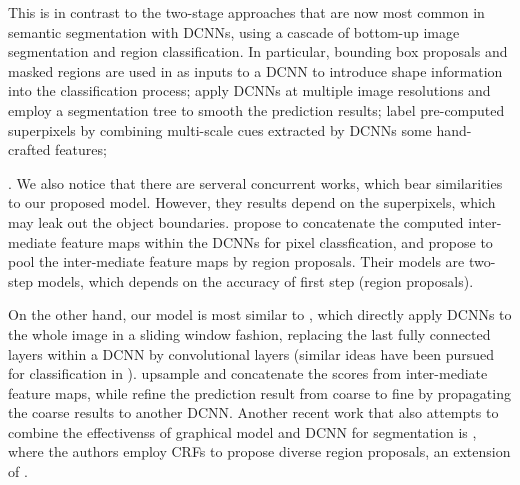 
This is in contrast to the two-stage approaches that are now most common in semantic segmentation with DCNNs, using a cascade of bottom-up image segmentation and region classification. In particular, bounding box proposals and masked regions are used in 
\citet{girshick2014rcnn, hariharan2014simultaneous}  as inputs to a DCNN to introduce  shape information into the classification process; \citet{farabet2013learning} apply DCNNs at multiple image resolutions and employ a segmentation tree to smooth the prediction results;  \citet{mostajabi2014feedforward} label pre-computed superpixels by 
 combining  multi-scale cues extracted by DCNNs  some hand-crafted features;


. We also notice that there are serveral concurrent works, which bear similarities to our proposed model.  However, they results depend on the superpixels, which may leak out the object boundaries. \citet{hariharan2014hypercolumns} propose to concatenate the computed inter-mediate feature maps within the DCNNs for pixel classfication, and \citet{dai2014convolutional} propose to pool the inter-mediate feature maps by region proposals. Their models are two-step models, which depends on the accuracy of first step (\ie region proposals). 


On the other hand, our model is most similar to \citet{long2014fully, eigen2014predicting}, which directly apply DCNNs to the whole image in a sliding window fashion, replacing the last fully connected layers within a DCNN  by convolutional layers (similar ideas have been pursued for classification in \cite{simonyan2014very,papandreou2014untangling}). \citet{long2014fully} upsample and concatenate the scores from inter-mediate feature maps, while \citet{eigen2014predicting} refine the prediction result from coarse to fine by propagating the coarse results to another DCNN. Another recent work that also attempts to combine the effectivenss of graphical model and DCNN for segmentation is \citet{cogswell2014combining}, where the authors employ CRFs to propose diverse region proposals, an extension of \citet{yadollahpour2013discriminative}.

